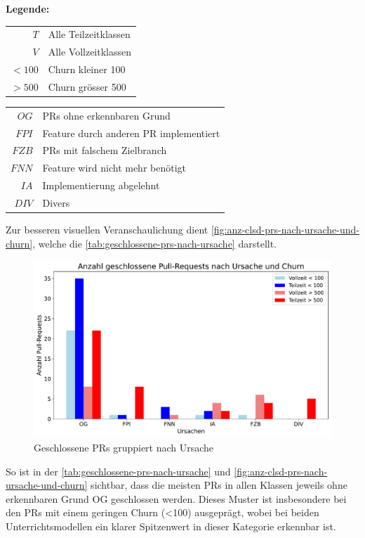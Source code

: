 \newpage
\textbf{Legende:}

\noindent
\begin{minipage}[t]{0.3\textwidth}
\begin{tabular}{r l}
$T$ & Alle Teilzeitklassen \\
$V$ & Alle Vollzeitklassen \\
$< 100$ & Churn kleiner 100 \\
$> 500$ & Churn grösser 500 \\
\end{tabular}
\end{minipage}
\hfill
\begin{minipage}[t]{0.6\textwidth}
\begin{tabular}{r l}
$OG$ & PRs ohne erkennbaren Grund \\
$FPI$ & Feature durch anderen PR im\-plementiert \\
$FZB$ & PRs mit falschem Zielbranch \\
$FNN$ & Feature wird nicht mehr benötigt \\
$IA$ & Implementierung abgelehnt  \\
$DIV$ & Divers \\
\end{tabular}
\end{minipage}


Zur besseren visuellen Veranschaulichung dient \autoref{fig:anz-clsd-prs-nach-ursache-und-churn}, welche die \autoref{tab:geschlossene-prs-nach-ursache} darstellt.


\begin{figure}[htbp]
    \includegraphics[width=\textwidth]{Figures/ursachenanalyse.pdf}
    \caption{Geschlossene PRs gruppiert nach Ursache}
    \label{fig:anz-clsd-prs-nach-ursache-und-churn}
\end{figure}
So ist in der \autoref{tab:geschlossene-prs-nach-ursache} und \autoref{fig:anz-clsd-prs-nach-ursache-und-churn} sichtbar, dass die meisten PRs in allen Klassen jeweils ohne erkennbaren Grund OG geschlossen werden. Dieses Muster ist insbesondere bei den PRs mit einem geringen Churn (<100) ausgeprägt, wobei bei beiden Unterrichtsmodellen ein klarer Spitzenwert in dieser Kategorie erkennbar ist.


